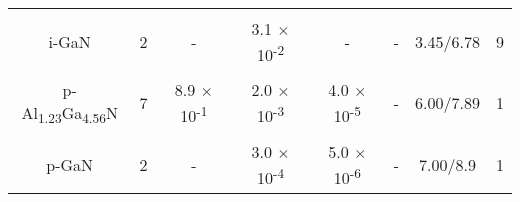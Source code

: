 \begin{table}[!htp]
{\begin{minipage}{17cm}
{\begin{tabular}{cccccccc}
\cellcolor{Gray} & \cellcolor{Gray} & \cellcolor{Gray} & \cellcolor{Gray} & \cellcolor{Gray} & \cellcolor{Gray} & \cellcolor{Gray} & \cellcolor{Gray} \\
\multirow{-2}{*}{\cellcolor{Gray} i-GaN} & \multirow{-2}{*}{\cellcolor{Gray} 2} & \multirow{-2}{*}{\cellcolor{Gray} -} & \multirow{-2}{*}{\cellcolor{Gray} 3.1 $\times$ 10\textsuperscript{-2}} & \multirow{-2}{*}{\cellcolor{Gray} -} & \multirow{-2}{*}{\cellcolor{Gray} -} & \multirow{-2}{*}{\cellcolor{Gray} 3.45/6.78} & \multirow{-2}{*}{\cellcolor{Gray} 9} \\

\cellcolor{White} & \cellcolor{White} & \cellcolor{White} & \cellcolor{White} & \cellcolor{White} & \cellcolor{White} & \cellcolor{White} & \cellcolor{White} \\
\multirow{-2}{*}{\cellcolor{White} p-Al\textsubscript{1.23}Ga\textsubscript{4.56}N} & \multirow{-2}{*}{\cellcolor{White} 7} & \multirow{-2}{*}{\cellcolor{White} 8.9 $\times$ 10\textsuperscript{-1}} & \multirow{-2}{*}{\cellcolor{White} 2.0 $\times$ 10\textsuperscript{-3}} & \multirow{-2}{*}{\cellcolor{White} 4.0 $\times$ 10\textsuperscript{-5}} & \multirow{-2}{*}{\cellcolor{White} -} & \multirow{-2}{*}{\cellcolor{White} 6.00/7.89} & \multirow{-2}{*}{\cellcolor{White} 1} \\

\cellcolor{Gray} & \cellcolor{Gray} & \cellcolor{Gray} & \cellcolor{Gray} & \cellcolor{Gray} & \cellcolor{Gray} & \cellcolor{Gray} & \cellcolor{Gray} \\
\multirow{-2}{*}{\cellcolor{Gray} p-GaN} & \multirow{-2}{*}{\cellcolor{Gray} 2} & \multirow{-2}{*}{\cellcolor{Gray} -} & \multirow{-2}{*}{\cellcolor{Gray} 3.0 $\times$ 10\textsuperscript{-4}} & \multirow{-2}{*}{\cellcolor{Gray} 5.0 $\times$ 10\textsuperscript{-6}} & \multirow{-2}{*}{\cellcolor{Gray} -} & \multirow{-2}{*}{\cellcolor{Gray} 7.00/8.9} & \multirow{-2}{*}{\cellcolor{Gray} 1} \\
\bottomrule
\end{tabular}
}
\end{minipage}
}
\end{table}


\clearpage
{}
\specialsection
\headerspecialsection

{\hypersetup{urlcolor=ntnu,linkcolor=sophia} %


}

